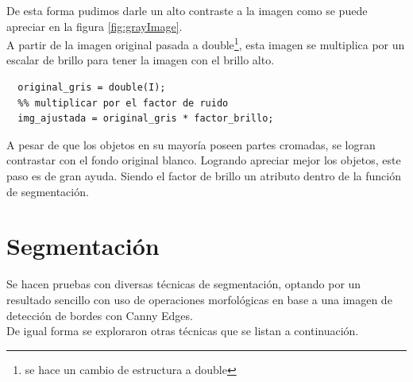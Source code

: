 \documentclass[a4paper, 11pt]{article}
\begin{document}
De esta forma pudimos darle un alto contraste a la imagen como se puede apreciar en la figura \ref{fig:grayImage}.\\

A partir de la imagen original pasada a double\footnote{se hace un cambio de estructura a double}, esta imagen se multiplica por un escalar de brillo para tener la imagen con el brillo alto.

\begin{lstlisting}[style=Matlab-editor, caption=Factor de brillo]
  %% pasar a double
  original_gris = double(I);
  %% multiplicar por el factor de ruido
  img_ajustada = original_gris * factor_brillo;
\end{lstlisting}

A pesar de que los objetos en su mayoría poseen partes cromadas, se logran contrastar con el fondo original blanco. Logrando apreciar mejor los objetos, este paso es de gran ayuda. Siendo el factor de brillo un atributo dentro de la función de segmentación.




\pagebreak
\section{Segmentación}

Se hacen pruebas con diversas técnicas de segmentación, optando por un resultado sencillo con uso de operaciones morfológicas en base a una imagen de detección de bordes con Canny Edges.\\

De igual forma se exploraron otras técnicas que se listan a continuación.\\
\end{document}
